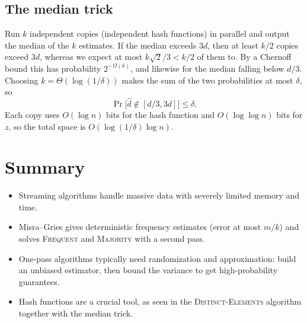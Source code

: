 \subsection{The median trick}
 
Run $k$ independent copies (independent hash functions) in parallel and output the median of the $k$ estimates. If the median exceeds $3d$, then at least $k/2$ copies exceed $3d$, whereas we expect at most $k\sqrt2/3<k/2$ of them to. By a Chernoff bound this has probability $2^{-\Omega(k)}$, and likewise for the median falling below $d/3$. Choosing $k=\Theta(\log(1/\delta))$ makes the sum of the two probabilities at most $\delta$, so
\[
  \Pr\big[\hat d\notin[d/3,3d]\big]\le\delta.
\]
Each copy uses $O(\log n)$ bits for the hash function and $O(\log\log n)$ bits for $z$, so the total space is $O(\log(1/\delta)\log n)$.
 
\section{Summary}
 
\begin{itemize}
  \item Streaming algorithms handle massive data with severely limited memory and time.
  \item Misra--Gries gives deterministic frequency estimates (error at most $m/k$) and solves \textsc{Frequent} and \textsc{Majority} with a second pass.
  \item One-pass algorithms typically need randomization and approximation: build an unbiased estimator, then bound the variance to get high-probability guarantees.
  \item Hash functions are a crucial tool, as seen in the \textsc{Distinct-Elements} algorithm together with the median trick.
\end{itemize}
 
% 

